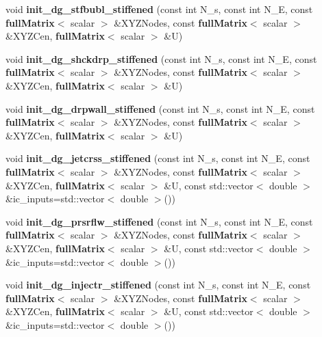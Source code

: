 \begin{DoxyCompactItemize}
\item 
void {\bfseries init\-\_\-dg\-\_\-stfbubl\-\_\-stiffened} (const int N\-\_\-s, const int N\-\_\-\-E, const {\bf full\-Matrix}$<$ scalar $>$ \&X\-Y\-Z\-Nodes, const {\bf full\-Matrix}$<$ scalar $>$ \&X\-Y\-Z\-Cen, {\bf full\-Matrix}$<$ scalar $>$ \&U)\label{init__cond_8h_a3b68b717c6ccb48475316b2e2e5a6ec7}

\item 
void {\bfseries init\-\_\-dg\-\_\-shckdrp\-\_\-stiffened} (const int N\-\_\-s, const int N\-\_\-\-E, const {\bf full\-Matrix}$<$ scalar $>$ \&X\-Y\-Z\-Nodes, const {\bf full\-Matrix}$<$ scalar $>$ \&X\-Y\-Z\-Cen, {\bf full\-Matrix}$<$ scalar $>$ \&U)\label{init__cond_8h_aee31d4fe9ccac2b1d907ce05dfee61b4}

\item 
void {\bfseries init\-\_\-dg\-\_\-drpwall\-\_\-stiffened} (const int N\-\_\-s, const int N\-\_\-\-E, const {\bf full\-Matrix}$<$ scalar $>$ \&X\-Y\-Z\-Nodes, const {\bf full\-Matrix}$<$ scalar $>$ \&X\-Y\-Z\-Cen, {\bf full\-Matrix}$<$ scalar $>$ \&U)\label{init__cond_8h_a54362f77ebdb9b7cdfdad70c50d8d06c}

\item 
void {\bfseries init\-\_\-dg\-\_\-jetcrss\-\_\-stiffened} (const int N\-\_\-s, const int N\-\_\-\-E, const {\bf full\-Matrix}$<$ scalar $>$ \&X\-Y\-Z\-Nodes, const {\bf full\-Matrix}$<$ scalar $>$ \&X\-Y\-Z\-Cen, {\bf full\-Matrix}$<$ scalar $>$ \&U, const std\-::vector$<$ double $>$ \&ic\-\_\-inputs=std\-::vector$<$ double $>$())\label{init__cond_8h_a7a5eb117c040b99ad375f85261fbf7b5}

\item 
void {\bfseries init\-\_\-dg\-\_\-prsrflw\-\_\-stiffened} (const int N\-\_\-s, const int N\-\_\-\-E, const {\bf full\-Matrix}$<$ scalar $>$ \&X\-Y\-Z\-Nodes, const {\bf full\-Matrix}$<$ scalar $>$ \&X\-Y\-Z\-Cen, {\bf full\-Matrix}$<$ scalar $>$ \&U, const std\-::vector$<$ double $>$ \&ic\-\_\-inputs=std\-::vector$<$ double $>$())\label{init__cond_8h_af72555f4852a679f283ad248536f6772}

\item 
void {\bfseries init\-\_\-dg\-\_\-injectr\-\_\-stiffened} (const int N\-\_\-s, const int N\-\_\-\-E, const {\bf full\-Matrix}$<$ scalar $>$ \&X\-Y\-Z\-Nodes, const {\bf full\-Matrix}$<$ scalar $>$ \&X\-Y\-Z\-Cen, {\bf full\-Matrix}$<$ scalar $>$ \&U, const std\-::vector$<$ double $>$ \&ic\-\_\-inputs=std\-::vector$<$ double $>$())\label{init__cond_8h_a81b389e8414f8cc376da882408fec9c5}


\end{DoxyCompactItemize}
